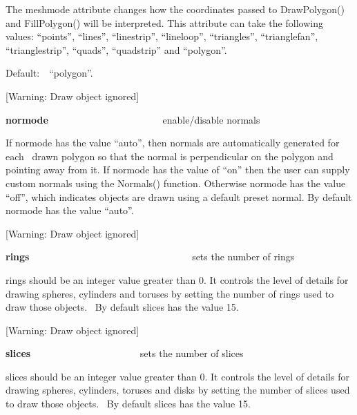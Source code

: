 \documentclass[letterpaper]{article}
\begin{document}
\bigskip

{
The \textsf{meshmode} attribute changes how the coordinates\textbf{ }passed to\textbf{ }\textsf{DrawPolygon()} and
\textsf{FillPolygon()} will be interpreted. This attribute can take the following values: \textsf{{}``points''},
\textsf{{}``lines''}, \textsf{{}``linestrip''}, \textsf{{}``lineloop''}, \textsf{{}``triangles''},
\textsf{{}``trianglefan''}, \textsf{{}``trianglestrip''}, \textsf{{}``quads''}, \textsf{{}``quadstrip''} and
\textsf{{}``polygon''}.}


\bigskip

{
Default:\ \ \textsf{{}``polygon''}.}


\bigskip

[Warning: Draw object ignored]

{
\textsf{\textbf{normode}} \ \ \ \ \ \ \ \ \ \ \ \ \ \  \ \ \ \ \ \ \ \ \ enable/disable normals }


\bigskip

{
If normode has the value \textsf{{}``auto'',} then normals are automatically generated for each \ drawn polygon so that
the normal is perpendicular on the polygon and pointing away from it. If normode has the value of ``on'' then the user
can supply custom normals using the \textsf{Normals()} function. Otherwise normode has the value \textsf{{}``off''},
which indicates objects are drawn using a default preset normal. By default normode has the value \textsf{{}``auto''.}}

[Warning: Draw object ignored]

{
\textsf{\textbf{rings}} \ \ \ \ \ \ \ \ \ \ \ \ \ \  \ \ \ \ \ \ \ \ \ \ \ \ \ \ \ \ \ \ \ sets the number of rings}


\bigskip

{
rings should be an integer value greater than 0. It controls the level of details for drawing spheres, cylinders and
toruses by setting the number of rings used to draw those objects. \ By default slices has the value 15\textsf{.}}


\bigskip

[Warning: Draw object ignored]

{
\textsf{\textbf{slices}} \ \ \ \ \ \ \ \ \ \ \ \ \ \ \ \  \ \ \ \ \ \ sets the number of slices}


\bigskip

{
slices should be an integer value greater than 0. It controls the level of details for drawing spheres, cylinders,
toruses and disks by setting the number of slices used to draw those objects. \ By default slices has the value
15\textsf{.}}
\end{document}

